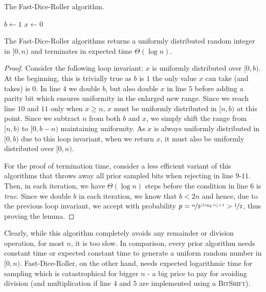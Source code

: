 \documentclass[a4paper, UKenglish, cleveref, autoref, thm-restate]{lipics-v2021}
\begin{document}
\begin{algorithm}[!htb] \label{alg:flips}
    \caption{The Fast-Dice-Roller algorithm.}
    $b \leftarrow 1$\;
    $x \leftarrow 0$\;
\end{algorithm}

\begin{lemma}
    The Fast-Dice-Roller algorithms returns a uniformly distributed random integer in $[0,n)$ and terminates in expected time $\Theta(\log n)$.
\end{lemma}
\begin{proof}
    Consider the following loop invariant: $x$ is uniformly distributed over $[0,b)$.
    At the beginning, this is trivially true as $b$ is $1$ the only value $x$ can take (and takes) is $0$.
    In line $4$ we double $b$, but also double $x$ in line $5$ before adding a parity bit which ensures uniformity in the enlarged new range.
    Since we reach line $10$ and $11$ only when $x \geq n$, $x$ must be uniformly distributed in $[n,b)$ at this point.
    Since we subtract $n$ from both $b$ and $x$, we simply shift the range from $[n,b)$ to $[0,b - n)$ maintaining uniformity.
    As $x$ is always uniformly distributed in $[0,b)$ due to this loop invariant, when we return $x$, it must also be uniformly distributed over $[0,n)$.

    For the proof of termination time, consider a less efficient variant of this algorithms that throws away all prior sampled bits when rejecting in line $9$-$11$.
    Then, in each iteration, we have $\Theta(\log n)$ steps before the condition in line $6$ is \emph{true}.
    Since we double $b$ in each iteration, we know that $b < 2n$ and hence, due to the previous loop invariant, we accept with probability $p = \nicefrac{n}{2^{\lfloor\log_2n\rfloor + 1}} > \nicefrac{1}{2}$, thus proving the lemma.
\end{proof}
Clearly, while this algorithm completely avoids any remainder or division operation, for most $n$, it is too slow.
In comparison, every prior algorithm needs constant time or expected constant time to generate a uniform random number in $[0,n)$.
Fast-Dice-Roller, on the other hand, needs expected logarithmic time for sampling which is catastrophical for bigger $n$ - a big price to pay for avoiding division (and multiplication if line $4$ and $5$ are implemented using a \textsc{BitShift}).
\end{document}
